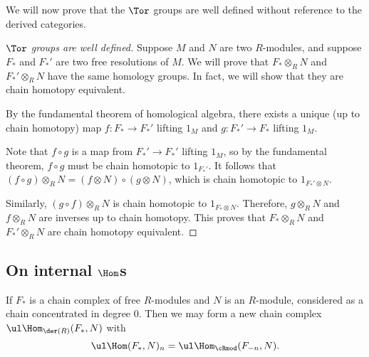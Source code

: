 \documentclass{standalone}
\begin{document}
We will now prove that the \(\Tor\) groups are well defined
without reference to the derived categories.
\begin{proof}[\(\Tor\) groups are well defined]
  Suppose \(M\) and \(N\) are two \(R\)-modules, and suppose
  \(F_*\) and \(F_*'\) are two free resolutions of \(M\).
  We will prove that \(F_* \otimes_R N\) and \(F_*' \otimes_R N\)
  have the same homology groups.
  In fact, we will show that they are chain homotopy equivalent.

  By the fundamental theorem of homological algebra,
  there exists a unique (up to chain homotopy) map
  \(f \colon F_* \to F_*'\) lifting \(1_M\) and
  \(g \colon F_*' \to F_*\) lifting \(1_M\).

  Note that \(f \circ g\) is a map from \(F_*' \to F_*'\) lifting \(1_M\),
  so by the fundamental theorem,
  \(f \circ g\) must be chain homotopic to \(1_{F_*'}\).
  It follows that
  \((f \circ g) \otimes_R N = (f \otimes N) \circ (g \otimes N)\),
  which is chain homotopic to \(1_{F_*' \otimes N}\).

  Similarly, \((g \circ f) \otimes_R N\) is chain homotopic to
  \(1_{F_* \otimes N}\).
  Therefore, \(g \otimes_R N\) and \(f \otimes_R N\) are inverses
  up to chain homotopy.
  This proves that \(F_* \otimes_R N\) and \(F_*' \otimes_R N\)
  are chain homotopy equivalent.
\end{proof}

\subsection{On internal \texorpdfstring{\(\Hom\)}{Hom}s}
\begin{definition}
  If \(F_*\) is a chain complex of free \(R\)-modules and
  \(N\) is an \(R\)-module, considered as a chain concentrated in degree \(0\).
  Then we may form a new chain complex \(\ul\Hom_{\der(R)}(F_*, N)\)
  with
  \[
    \ul\Hom(F_*, N)_n = \ul\Hom_{\cRmod}(F_{-n}, N).
  \]
\end{definition}
\end{document}
